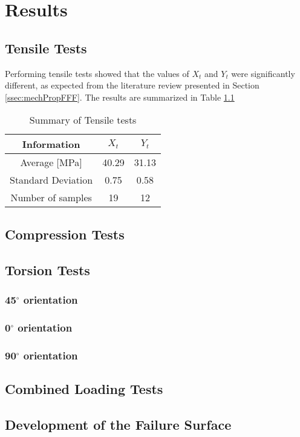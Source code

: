 \documentclass[main.tex]{subfiles}
\begin{document}
\chapter{Results} \label{ch:res}
\section{Tensile Tests} \label{sec:tensr}
Performing tensile tests showed that the values of $X_t$ and $Y_t$ were significantly different, as expected from the literature review presented in Section \ref{ssec:mechPropFFF}. The results are summarized in Table \ref{tab:tensrtab}
\begin{table} [h]
	\centering
	\caption{Summary of Tensile tests}
\begin{tabular}{ c| c c } 
	\toprule
	\textbf{Information} & $X_t$ & $Y_t$\\
	\midrule
	Average [MPa] & 40.29 & 31.13\\
	Standard Deviation & 0.75 & 0.58\\
	Number of samples & 19 & 12\\
	\bottomrule
\end{tabular}
\label{tab:tensrtab}
\end{table}

\section{Compression Tests} \label{sec:compr}
\section{Torsion Tests} \label{sec:torsr}
\subsection{45$^\circ$ orientation} \label{ssec:45r}
\subsection{0$^\circ$ orientation} \label{ssec:0r}
\subsection{90$^\circ$ orientation} \label{ssec:90r}
\section{Combined Loading Tests} \label{sec:clr}
\section{Development of the Failure Surface} \label{sec:fsc}

\end{document}

